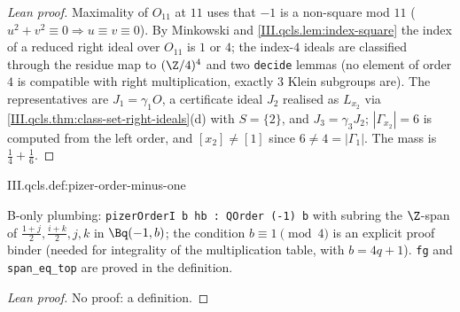 \begin{proof}[Lean proof]
Maximality of $O_{11}$ at $11$ uses that $-1$ is a non-square mod $11$ ($u^2+v^2\equiv0\Rightarrow u\equiv v\equiv0$). By Minkowski and \cref{III.qcls.lem:index-square} the index of a reduced right ideal over $O_{11}$ is $1$ or $4$; the index-$4$ ideals are classified through the residue map to $(\Z/4)^4$ and two \texttt{decide} lemmas (no element of order $4$ is compatible with right multiplication, exactly $3$ Klein subgroups are). The representatives are $J_1=\gamma_1O$, a certificate ideal $J_2$ realised as $L_{x_2}$ via \cref{III.qcls.thm:class-set-right-ideals}(d) with $S=\{2\}$, and $J_3=\gamma_3J_2$; $|\Gamma_{x_2}|=6$ is computed from the left order, and $[x_2]\neq[1]$ since $6\neq4=|\Gamma_1|$. The mass is $\frac14+\frac16$.
\end{proof}

\begin{definition}
\bonly
{}
\end{definition}
\begin{tfformal}{III.qcls.def:pizer-order-minus-one}
\begin{tffidelity}
B-only plumbing: \texttt{pizerOrderI b hb : QOrder (-1) b} with subring the $\Z$-span of $\tfrac{1+j}2,\tfrac{i+k}2,j,k$ in $\Bq(-1,b)$; the condition $b\equiv1\pmod4$ is an explicit proof binder (needed for integrality of the multiplication table, with $b=4q+1$). \texttt{fg} and \texttt{span\_eq\_top} are proved in the definition.
\end{tffidelity}
\end{tfformal}
\begin{proof}[Lean proof]
No proof: a definition.
\end{proof}

